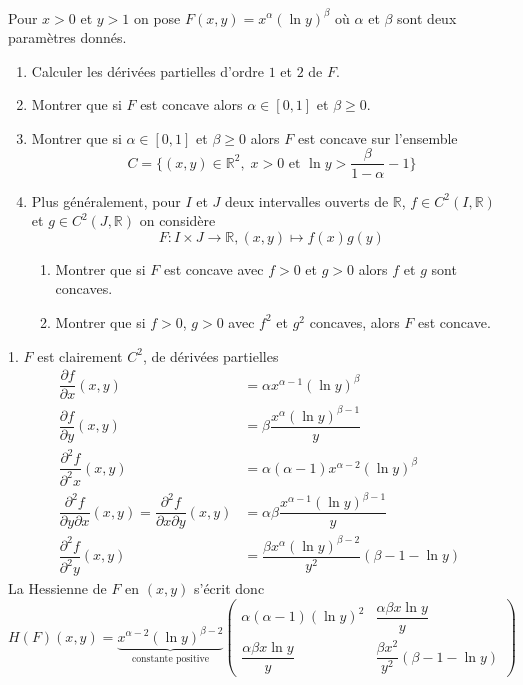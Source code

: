 \documentclass{fancybook}
\begin{document}
\begin{exercice}
Pour $x>0$ et $y>1$ on pose $F(x,y)=x^\alpha (\ln y)^\beta$ où $\alpha$ et $\beta$ sont deux paramètres donnés.
\begin{enumerate}
\item Calculer les dérivées partielles d'ordre $1$ et $2$ de $F$.
\item Montrer que si $F$ est concave alors $\alpha \in [0,1]$ et $\beta \geq 0$.
\item Montrer que si $\alpha \in [0,1]$ et $\beta \geq 0$ alors $F$ est concave sur l'ensemble $$C=\{(x,y)\in \mathbb R^2, \; x>0 \text{ et } \ln y > \dfrac{\beta}{1-\alpha}-1 \}$$
\item Plus généralement, pour $I$ et $J$ deux intervalles ouverts de $\mathbb R$, $f\in C^2(I,\mathbb R)$ et $g\in C^2(J,\mathbb R)$ on considère $$F:I\times J \to \mathbb R, (x,y)\mapsto f(x)g(y)$$
\begin{enumerate}
\item Montrer que si $F$ est concave avec $f>0$ et $g>0$ alors $f$ et $g$ sont concaves.
\item Montrer que si $f>0$, $g>0$ avec $f^2$ et $g^2$ concaves, alors $F$ est concave.
\end{enumerate}
\end{enumerate}
\end{exercice}
1. $F$ est clairement $C^2$, de dérivées partielles 
$$\begin{aligned}
\dfrac{\partial f}{\partial x}(x,y) &= \alpha x^{\alpha -1}(\ln y)^\beta\\
\dfrac{\partial f}{\partial y}(x,y) &= \beta \dfrac{x^\alpha (\ln y)^{\beta-1} }{y} \\
\dfrac{\partial^2 f}{\partial^2 x}(x,y) &= \alpha (\alpha -1) x^{\alpha -2}(\ln y)^\beta \\
\dfrac{\partial^2 f}{\partial y \partial x}(x,y) = \dfrac{\partial^2 f}{\partial x \partial y}(x,y) &= \alpha \beta \dfrac{x^{\alpha-1} (\ln y)^{\beta-1} }{y}\\
\dfrac{\partial^2 f}{\partial^2 y}(x,y) &= \dfrac{\beta x^\alpha (\ln y)^{\beta-2}}{y^2}(\beta -1 -\ln y)
\end{aligned}$$
La Hessienne de $F$ en $(x,y)$ s'écrit donc 
$$ H(F)(x,y) = \underbrace{x^{\alpha -2}(\ln y)^{\beta-2}}_{\text{constante positive}} \begin{pmatrix}
\alpha(\alpha -1)(\ln y)^2 & \dfrac{\alpha \beta x\ln y}{y} \\
\dfrac{\alpha \beta x\ln y}{y} & \dfrac{\beta x^2}{y^2}(\beta -1 -\ln y)
\end{pmatrix}$$
\end{document}
